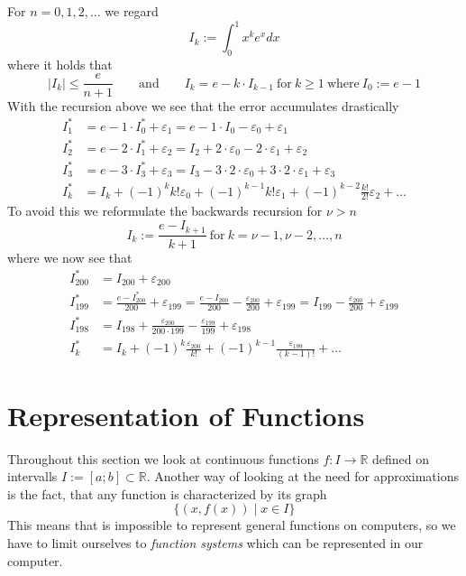 \begin{example}
   For \(n = 0, 1, 2, \ldots\) we regard
   \[I_k := \int_0^1x^k e^x dx\]
   where it holds that
   \[|I_k| \leq \frac{e}{n+1} \qquad\text{and}\qquad I_k = e - k \cdot I_{k-1}~\text{for}~k \geq 1~\text{where}~I_0 := e - 1\]
   With the recursion above we see that the error accumulates drastically
   \begin{equation*}
      \begin{split}
         I_1^\ast & = e - 1 \cdot I_0^\ast + \varepsilon_1 = e - 1 \cdot I_0 - \varepsilon_0 + \varepsilon_1\\
         I_2^\ast & = e - 2 \cdot I_1^\ast + \varepsilon_2 = I_2 + 2 \cdot \varepsilon_0 - 2 \cdot \varepsilon_1 + \varepsilon_2\\
         I_3^\ast & = e - 3 \cdot I_3^\ast + \varepsilon_3 = I_3 - 3 \cdot 2 \cdot \varepsilon_0 + 3 \cdot 2 \cdot \varepsilon_1 + \varepsilon_3\\
         I_k^\ast & = I_k + (-1)^kk!\varepsilon_0 + (-1)^{k-1}k! \varepsilon_1 + (-1)^{k-2}\frac{k!}{2!} \varepsilon_2 + \ldots
      \end{split}
   \end{equation*}
   To avoid this we reformulate the backwards recursion for \(\nu > n\)
   \[I_k := \frac{e - I_{k+1}}{k + 1}~\text{for}~k = \nu - 1, \nu - 2, \ldots, n\]
   where we now see that
   \begin{equation*}
      \begin{split}
         I_{200}^\ast & = I_{200} + \varepsilon_{200}\\
         I_{199}^\ast & = \frac{e - I_{200}^\ast}{200} + \varepsilon_{199} = \frac{e - I_{200}}{200} - \frac{\varepsilon_{200}}{200} + \varepsilon_{199} = I_{199} - \frac{\varepsilon_{200}}{200} + \varepsilon_{199}\\
         I_{198}^\ast & = I_{198} + \frac{\varepsilon_{200}}{200 \cdot 199} - \frac{\varepsilon_{199}}{199} + \varepsilon_{198}\\
         I_{k}^\ast & = I_k + (-1)^k \frac{\varepsilon_{200}}{k!} + (-1)^{k-1} \frac{\varepsilon_{199}}{(k-1)!} + \ldots
      \end{split}
   \end{equation*}
\end{example}

\section{Representation of Functions}
Throughout this section we look at continuous functions \(f: I \to \mathbb{R}\) defined on intervalls \(I := [a; b] \subset \mathbb{R}\).
Another way of looking at the need for approximations is the fact, that any function is characterized by its graph
\[\{(x, f(x)) \mid x \in I\}\]
This means that is impossible to represent general functions on computers, so we have to limit ourselves to \emph{function systems} which can be represented in our computer.

